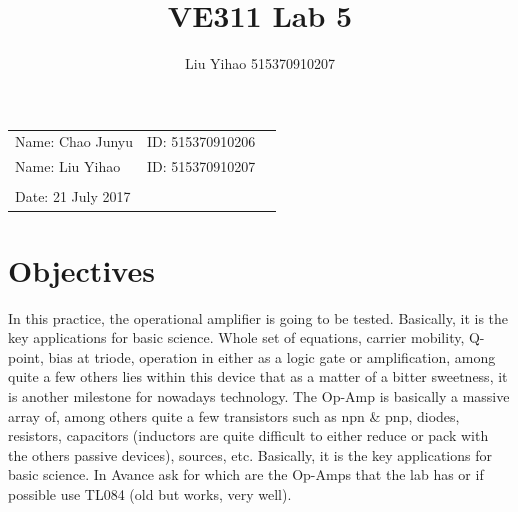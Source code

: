 \documentclass{article}
\title{VE311 Lab 5}
\author{Liu Yihao 515370910207}
\date{}
\begin{document}
\vspace*{0.25cm}

\hrulefill

\thispagestyle{empty}

\begin{center}
\begin{large}
\end{large}

\hrulefill

\vspace*{5cm}
\begin{Large}
\end{Large}

\vspace{2em}

\begin{large}
\end{large}
\end{center}

\vfill

\begin{table}[h!]
\flushleft
\begin{tabular}{lll}
Name: Chao Junyu \hspace*{2em}&
ID: 515370910206\hspace*{2em}\\
Name: Liu Yihao \hspace*{2em}&
ID: 515370910207\hspace*{2em}\\
\\

Date: 21 July 2017 

\end{tabular}
\end{table}

\hfill

\newpage
\tableofcontents
\newpage

\section{Objectives}
 In this practice,
the operational amplifier is going to be tested. Basically, it is the key applications for basic
science. Whole set of equations, carrier mobility, Q-point, bias at triode, operation in either
as a logic gate or amplification, among quite a few others lies within this device that as a
matter of a bitter sweetness, it is another milestone for nowadays technology. The Op-Amp
is basically a massive array of, among others quite a few transistors such as npn \& pnp,
diodes, resistors, capacitors (inductors are quite difficult to either reduce or pack with the
others passive devices), sources, etc. Basically, it is the key applications for basic science.
In Avance ask for which are the Op-Amps that the lab has or if possible use TL084 (old but
works, very well).
\end{document}
